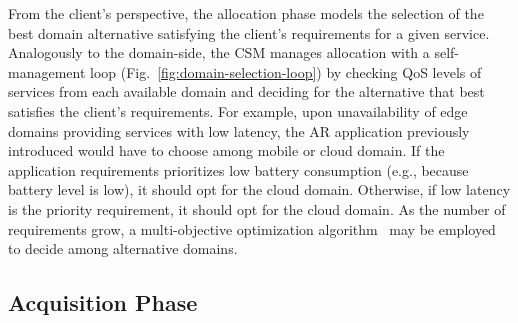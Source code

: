 
From the client's perspective, the allocation phase models the selection of the best domain alternative satisfying the client's requirements for a given service. 
Analogously to the domain-side, the CSM manages allocation with a self-management loop (Fig.~\ref{fig:domain-selection-loop}) by checking QoS levels of services from each available domain and deciding for the alternative that best satisfies the client's requirements. 
For example, upon unavailability of edge domains providing services with low latency, the AR application previously introduced would have to choose among mobile or cloud domain. If the application requirements prioritizes low battery consumption (e.g., because battery level is low), it should opt for the cloud domain. Otherwise, if low latency is the priority requirement, it should opt for the cloud domain. As the number of requirements grow, a multi-objective optimization algorithm~\cite{Olson1996} may be employed to decide among alternative domains.






\subsection*{Acquisition Phase}\label{sec:A3-E-acquisition}

